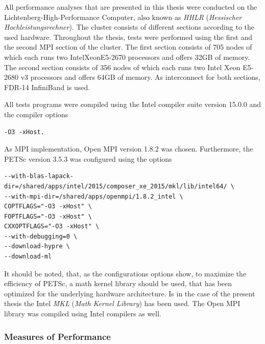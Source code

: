 All performance analyses that are presented in this thesis were conducted on the Lichtenberg-High-Performance Computer, also known as \emph{HHLR} (\emph{Hessischer Hochleistungsrechner}). The cluster consists of different sections according to the used hardware. Throughout the thesis, tests were performed using the first and the second MPI section of the cluster. The first section consists of 705 nodes of which each runs two Intel\textregistered Xeon\textregistered E5-2670 processors and offers 32GB of memory. The second section consists of 356 nodes of which each runs two Intel Xeon E5-2680 v3 processors and offers 64GB of memory. As interconnect for both sections, FDR-14 InfiniBand is used.

All tests programs were compiled using the Intel compiler suite version 15.0.0 and the compiler options
\begin{lstlisting}
-O3 -xHost.
\end{lstlisting}
As MPI implementation, Open MPI version 1.8.2 was chosen. Furthermore, the PETSc version 3.5.3 was configured using the options
\begin{lstlisting}
--with-blas-lapack-dir=/shared/apps/intel/2015/composer_xe_2015/mkl/lib/intel64/ \
--with-mpi-dir=/shared/apps/openmpi/1.8.2_intel \
COPTFLAGS="-O3 -xHost" \
FOPTFLAGS="-O3 -xHost" \
CXXOPTFLAGS="-O3 -xHost" \
--with-debugging=0 \
--download-hypre \
--download-ml
\end{lstlisting}
It should be noted, that, as the configurations options show, to maximize the efficiency of PETSc, a math kernel library should be used, that has been optimized for the underlying hardware architecture. Is in the case of the present thesis the Intel \emph{MKL} (\emph{Math Kernel Library}) has been used. The Open MPI library was compiled using Intel compilers as well.

\subsubsection{Measures of Performance}

